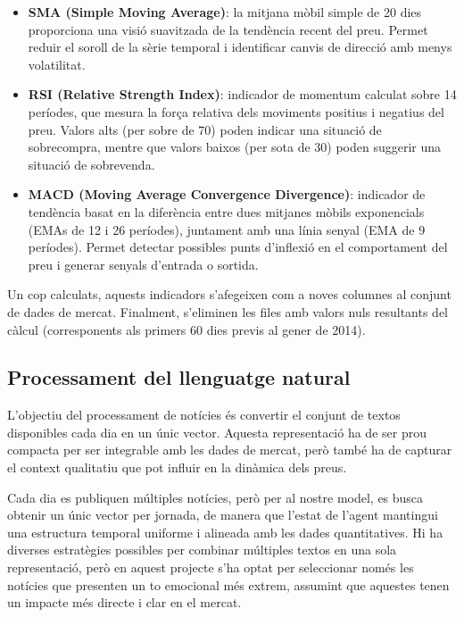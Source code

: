 \documentclass[12pt,a4paper,twoside]{book}
\begin{document}
\begin{itemize}
    \item \textbf{SMA (Simple Moving Average)}: la mitjana mòbil simple de 20 dies proporciona una visió suavitzada de la tendència recent del preu. Permet reduir el soroll de la sèrie temporal i identificar canvis de direcció amb menys volatilitat.

    \item \textbf{RSI (Relative Strength Index)}: indicador de momentum calculat sobre 14 períodes, que mesura la força relativa dels moviments positius i negatius del preu. Valors alts (per sobre de 70) poden indicar una situació de sobrecompra, mentre que valors baixos (per sota de 30) poden suggerir una situació de sobrevenda.

    \item \textbf{MACD (Moving Average Convergence Divergence)}: indicador de tendència basat en la diferència entre dues mitjanes mòbils exponencials (EMAs de 12 i 26 períodes), juntament amb una línia senyal (EMA de 9 períodes). Permet detectar possibles punts d'inflexió en el comportament del preu i generar senyals d'entrada o sortida.
\end{itemize}

Un cop calculats, aquests indicadors s'afegeixen com a noves columnes al conjunt de dades de mercat. Finalment, s'eliminen les files amb valors nuls resultants del càlcul (corresponents als primers 60 dies previs al gener de 2014).

\subsection{Processament del llenguatge natural}

L'objectiu del processament de notícies és convertir el conjunt de textos disponibles cada dia en un únic vector. Aquesta representació ha de ser prou compacta per ser integrable amb les dades de mercat, però també ha de capturar el context qualitatiu que pot influir en la dinàmica dels preus.

Cada dia es publiquen múltiples notícies, però per al nostre model, es busca obtenir un únic vector per jornada, de manera que l'estat de l'agent mantingui una estructura temporal uniforme i alineada amb les dades quantitatives. Hi ha diverses estratègies possibles per combinar múltiples textos en una sola representació, però en aquest projecte s'ha optat per seleccionar només les notícies  que presenten un to emocional més extrem, assumint que aquestes tenen un impacte més directe i clar en el mercat.
\end{document}
